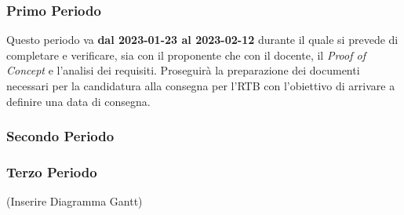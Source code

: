 \subsubsection{Primo Periodo}
Questo periodo va \textbf{dal 2023-01-23 al 2023-02-12} durante il quale si prevede di completare e verificare, sia con il proponente che con il docente, il {\it{Proof of Concept}} e l'analisi dei requisiti.
Proseguirà la preparazione dei documenti necessari per la candidatura alla consegna per l'RTB con l'obiettivo di arrivare a definire una data di consegna.

\subsubsection{Secondo Periodo}

\subsubsection{Terzo Periodo}

(Inserire Diagramma Gantt)